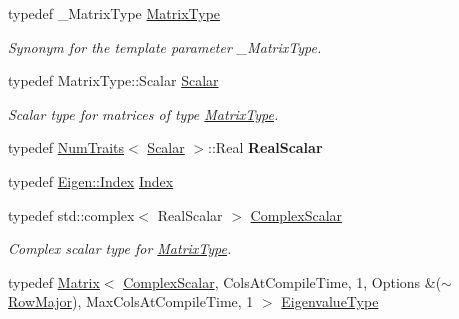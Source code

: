 \begin{DoxyCompactItemize}
\mbox{\label{group___eigenvalues___module_ad61f6278843a601096276c9a72c0252f}} 
typedef \+\_\+\+Matrix\+Type \hyperlink{group___eigenvalues___module_ad61f6278843a601096276c9a72c0252f}{Matrix\+Type}
\begin{DoxyCompactList}\small\item\em Synonym for the template parameter {\ttfamily \+\_\+\+Matrix\+Type}. \end{DoxyCompactList}\item 
\mbox{\label{group___eigenvalues___module_a61035d40c9498bb1d47628cdd4946785}} 
typedef Matrix\+Type\+::\+Scalar \hyperlink{group___eigenvalues___module_a61035d40c9498bb1d47628cdd4946785}{Scalar}
\begin{DoxyCompactList}\small\item\em Scalar type for matrices of type \hyperlink{group___eigenvalues___module_ad61f6278843a601096276c9a72c0252f}{Matrix\+Type}. \end{DoxyCompactList}\item 
\mbox{\label{group___eigenvalues___module_a7c2f4ce02837e653f92d40a3f3acad87}} 
typedef \hyperlink{group___core___module_struct_eigen_1_1_num_traits}{Num\+Traits}$<$ \hyperlink{group___eigenvalues___module_a61035d40c9498bb1d47628cdd4946785}{Scalar} $>$\+::Real {\bfseries Real\+Scalar}
\item 
typedef \hyperlink{namespace_eigen_a62e77e0933482dafde8fe197d9a2cfde}{Eigen\+::\+Index} \hyperlink{group___eigenvalues___module_abc0218d8b902af0d6c759bfc0a8a8d74}{Index}
\item 
typedef std\+::complex$<$ Real\+Scalar $>$ \hyperlink{group___eigenvalues___module_a3604c99a69fac3bee42c88cb2b589143}{Complex\+Scalar}
\begin{DoxyCompactList}\small\item\em Complex scalar type for \hyperlink{group___eigenvalues___module_ad61f6278843a601096276c9a72c0252f}{Matrix\+Type}. \end{DoxyCompactList}\item 
typedef \hyperlink{group___core___module_class_eigen_1_1_matrix}{Matrix}$<$ \hyperlink{group___eigenvalues___module_a3604c99a69fac3bee42c88cb2b589143}{Complex\+Scalar}, Cols\+At\+Compile\+Time, 1, Options \&($\sim$\hyperlink{group__enums_ggaacded1a18ae58b0f554751f6cdf9eb13acfcde9cd8677c5f7caf6bd603666aae3}{Row\+Major}), Max\+Cols\+At\+Compile\+Time, 1 $>$ \hyperlink{group___eigenvalues___module_ad3a663b1ff5200a098dabbbf9b7162b1}{Eigenvalue\+Type}

\end{DoxyCompactItemize}

